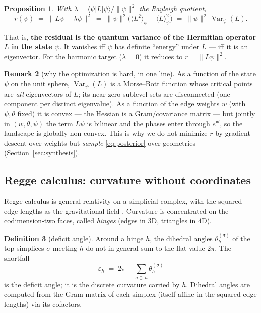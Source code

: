 \documentclass[11pt]{article}
\DeclareMathOperator{\Var}{Var}
\newcommand{\ket}[1]{\lvert #1 \rangle}
\newcommand{\bra}[1]{\langle #1 \rvert}
\newcommand{\norm}[1]{\lVert #1 \rVert}
\theoremstyle{definition}
\newtheorem{definition}{Definition}[section]
\newtheorem{remark}[definition]{Remark}
\theoremstyle{plain}
\newtheorem{proposition}[definition]{Proposition}
\begin{document}
\begin{proposition}
\label{prop:variance}
With $\lambda=\bra{\psi}L\ket{\psi}/\norm{\psi}^2$ the Rayleigh quotient,
\begin{equation}
r(\psi)\;=\;\norm{L\psi-\lambda\psi}^2
\;=\;\norm{\psi}^2\Big(\langle L^2\rangle_\psi-\langle L\rangle_\psi^2\Big)
\;=\;\norm{\psi}^2\,\Var_\psi(L).
\end{equation}
\end{proposition}

That is, \textbf{the residual is the quantum variance of the Hermitian operator $L$ in the
state $\psi$}. It vanishes iff $\psi$ has definite ``energy'' under $L$ --- iff it is an
eigenvector. For the harmonic target ($\lambda=0$) it reduces to $r=\norm{L\psi}^2$.

\begin{remark}[why the optimization is hard, in one line]
As a function of the state $\psi$ on the unit sphere, $\Var_\psi(L)$ is a Morse--Bott
function whose critical points are \emph{all} eigenvectors of $L$; its near-zero sublevel
sets are disconnected (one component per distinct eigenvalue). As a function of the edge
weights $w$ (with $\psi,\theta$ fixed) it is convex --- the Hessian is a Gram/covariance
matrix --- but jointly in $(w,\theta,\psi)$ the term $L\psi$ is bilinear and the phases
enter through $e^{\mathrm{i}\theta}$, so the landscape is globally non-convex. This is why
we do not minimize $r$ by gradient descent over weights but \emph{sample}
\eqref{eq:posterior} over geometries (Section~\ref{sec:synthesis}).
\end{remark}

\subsection{Regge calculus: curvature without coordinates}
\label{sec:regge}

Regge calculus is general relativity on a simplicial complex, with the squared edge lengths
as the gravitational field \cite{regge1961}. Curvature is concentrated on the
codimension-two faces, called \emph{hinges} (edges in $3$D, triangles in $4$D).

\begin{definition}[deficit angle]
Around a hinge $h$, the dihedral angles $\theta_h^{(\sigma)}$ of the top simplices $\sigma$
meeting $h$ do not in general sum to the flat value $2\pi$. The shortfall
\begin{equation}
\varepsilon_h \;=\; 2\pi - \sum_{\sigma\supset h}\theta_h^{(\sigma)}
\end{equation}
is the deficit angle; it is the discrete curvature carried by $h$. Dihedral angles are
computed from the Gram matrix of each simplex (itself affine in the squared edge lengths)
via its cofactors.
\end{definition}
\end{document}
